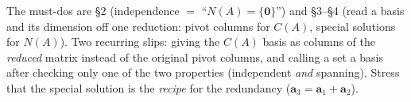 \documentclass[10pt]{article}
\newcommand{\zero}{\mathbf{0}}
\begin{document}
\begin{teachernote}
The must-dos are \S2 (independence $=$ ``$N(A)=\{\zero\}$'') and \S3--\S4 (read a basis and its dimension
off one reduction: pivot columns for $C(A)$, special solutions for $N(A)$). Two recurring slips: giving the
$C(A)$ basis as columns of the \emph{reduced} matrix instead of the original pivot columns, and calling a
set a basis after checking only one of the two properties (independent \emph{and} spanning). Stress that
the special solution is the \emph{recipe} for the redundancy ($\mathbf{a}_3=\mathbf{a}_1+\mathbf{a}_2$).
\end{teachernote}
\end{document}
